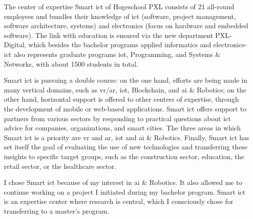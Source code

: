 \begin{mdframed}[hidealllines=true, backgroundcolor=yellow, innerleftmargin=3pt, innerrightmargin=3pt, leftmargin=-3pt, rightmargin=-3pt]
  The center of expertise Smart \acs{ict} of Hogeschool PXL consists of 21 all\hyp{}round employees and bundles their knowledge of \acs{ict} (software, project management, software architecture, systems) and electronics (focus on hardware and embedded software). The link with education is ensured via the new department PXL\hyp{}Digital, which besides the bachelor programs applied informatics and electronics\hyp{}\acs{ict} also represents graduate programs \acl{iot}, Programming, and Systems \& Networks, with about 1500 students in total.
\end{mdframed}


\begin{mdframed}[hidealllines=true, backgroundcolor=yellow, innerleftmargin=3pt, innerrightmargin=3pt, leftmargin=-3pt, rightmargin=-3pt]
  Smart \acs{ict} is pursuing a double course: on the one hand, efforts are being made in many vertical domains, such as \acs{vr}/\acs{ar}, \ac{iot}, Blockchain, and \acl{ai} \& Robotics; on the other hand, horizontal support is offered to other centers of expertise, through the development of mobile or web\hyp{}based applications. Smart \acs{ict} offers support to partners from various sectors by responding to practical questions about \acs{ict} advice for companies, organizations, and smart cities. The three areas in which Smart \acs{ict} is a priority are \acs{vr} and \acs{ar}, \acl{iot} and \acl{ai} \& Robotics. Finally, Smart \acs{ict} has set itself the goal of evaluating the use of new technologies and transferring these insights to specific target groups, such as the construction sector, education, the retail sector, or the healthcare sector.
\end{mdframed}

\begin{mdframed}[hidealllines=true, backgroundcolor=yellow, innerleftmargin=3pt, innerrightmargin=3pt, leftmargin=-3pt, rightmargin=-3pt]
  I chose Smart \acs{ict} because of my interest in \acl{ai} \& Robotics. It also allowed me to continue working on a project I initiated during my bachelor program. Smart \acs{ict} is an expertise center where research is central, which I consciously chose for transferring to a master's program.
\end{mdframed}